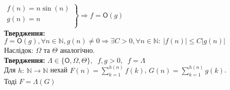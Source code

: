 \documentclass[a4paper,12pt]{article}
\newcommand{\dsum}{\displaystyle\sum}
\begin{document}
    $\left.
        \begin{array}{ccc}
            f(n)=n\sin(n) \\
            g(n)=n  \\
        \end{array}
    \right\}\Rightarrow f=\mathsf{O}(g)$ \\
    \textbf{Твердження:} $f=\mathsf{O}(g),\forall n\in\mathbb{N},g(n)\ne0\Rightarrow
    \exists C>0,\forall n\in\mathbb{N}:\:|f(n)|\leqslant C|g(n)|$ \\
    Наслідок: $\Omega$ та $\Theta$ аналогічно. \\
    \textbf{Твердження:} $\Lambda\in\{\mathsf{O},\Omega,\Theta\},\:$ $f,g>0,\:$ $f=\Lambda$ \\
    Для $h:\:\mathbb{N}\rightarrow\mathbb{N}$ нехай $F(n)=\dsum\limits_{k=1}^{h(n)}f(k)$, $G(n)=\dsum\limits_{k=1}^{h(n)}g(k)$. \\
    Тоді $F=\Lambda(G)$ 

\newpage
\end{document}
